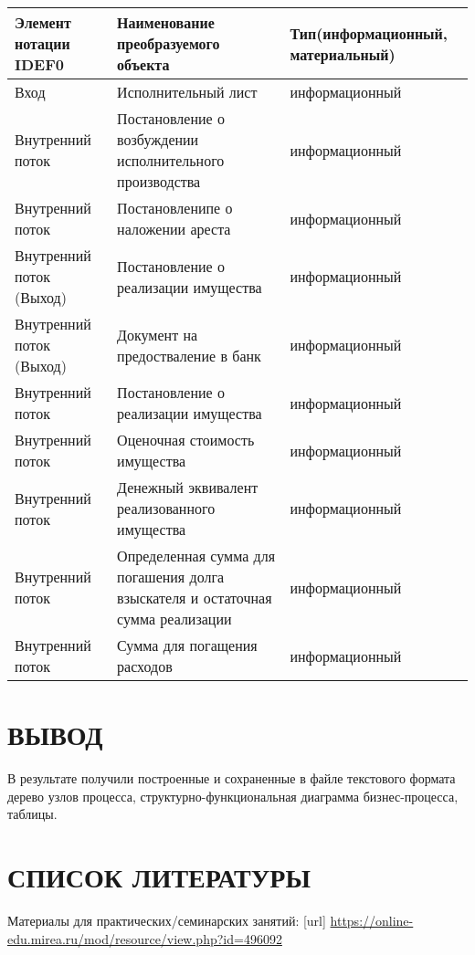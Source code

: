 {\small
\begin{longtable}{
		|p{}
		|p{}
		|p{}
		| } 
	\hline
	\textbf{Элемент нотации IDEF0}
		& \textbf{Наименование преобразуемого объекта}
		& \textbf{Тип(информационный, материальный)} \\ \hline
	\endhead
	Вход & Исполнительный лист & информационный \\ \hline
	Внутренний поток
		& Постановление о возбуждении исполнительного производства
		& информационный \\ \hline
	Внутренний поток & Постановленипе о наложении ареста
		& информационный \\ \hline
	Внутренний поток (Выход) & Постановление о реализации имущества
		& информационный \\ \hline
	Внутренний поток (Выход) & Документ на предостваление в банк
		& информационный \\ \hline
	Внутренний поток & Постановление о реализации имущества
		& информационный \\ \hline
	Внутренний поток & Оценочная стоимость имущества
		& информационный \\ \hline
	Внутренний поток & Денежный эквивалент реализованного имущества
		& информационный \\ \hline
	Внутренний поток & Определенная сумма для погашения долга взыскателя
			и остаточная сумма реализации
		& информационный \\ \hline
	Внутренний поток & Сумма для погащения расходов
		& информационный \\ \hline
\end{longtable}
}

\section*{ВЫВОД}
В результате получили построенные и сохраненные в файле текстового формата
дерево узлов процесса, структурно-функциональная диаграмма бизнес-процесса,
таблицы.

\section*{СПИСОК ЛИТЕРАТУРЫ}
\begin{thebibliography}{}
    \bibitem{}  Материалы для практических/семинарских занятий: [url] 
		\url{https://online-edu.mirea.ru/mod/resource/view.php?id=496092}
\end{thebibliography}
